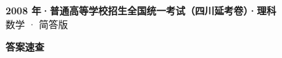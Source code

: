 \documentclass[zihao=-4, a4paper]{ctexart}
\begin{document}
\begin{center}
  {\Large\bfseries 2008 年·普通高等学校招生全国统一考试（四川延考卷）·理科}\\[4pt]
  {\large 数学 · 简答版}
\end{center}
\medskip
{}

\clearpage
{}
\begin{center}{\Large\bfseries 答案速查}\end{center}
\medskip

\end{document}
